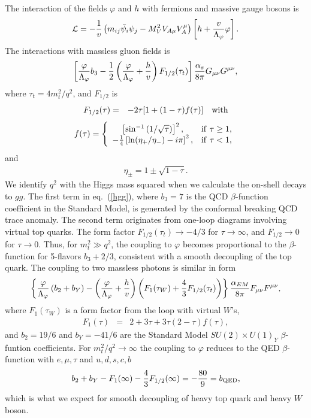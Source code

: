 \documentclass[12pt]{article}
\def\beq{\begin{eqnarray}}
\def\eeq{\end{eqnarray}}
\def\bea{\begin{eqnarray}}
\def\eea{\end{eqnarray}}
\begin{document}
The interaction of the fields 
$\varphi$
and $h$ with fermions and massive gauge bosons is 
\beq
{\cal L} = -\frac{1}{v} \left( m_{ij}\bar\psi_i
\psi_j - M_V^2 V_{A\mu}V_A^\mu \right) \left[ h+ 
\frac{v}{\Lambda_\varphi}  \varphi
\right] .
\eeq
The interactions with massless gluon fields is
\beq
\left[ {\varphi\over \Lambda_\varphi} 
b_3- \frac{1}{2}\left ({\varphi\over
\Lambda_\varphi}+{h\over v}\right ) F_{1/2}(\tau_t)\right]
\frac{\alpha_s}{8\pi}G_{\mu\nu}G^{\mu\nu},
\label{hgg}
\eeq
where $\tau_t=4m^2_t/q^2$, and $F_{1/2}$ is~\cite{HHG}
\bea
F_{1/2}(\tau) & = & -2\tau [1+(1-\tau)f(\tau)]~~~{\rm with} 
\eea
\beq
f(\tau)  =  \left\{ \begin{array}{cc}
      \left[ \sin^{-1}\left( 1/\sqrt{\tau}\right)\right]^2, &
               {\rm if}~\tau\ge 1, \\
      -\frac{1}{4}\left[ \ln (\eta_+/\eta_-)-i\pi\right]^2, &
               {\rm if}~\tau < 1,
                      \end{array}  \right.
\eeq
and
\beq
\eta_{\pm} = 1 \pm \sqrt{1-\tau} .
\eeq
 We identify $q^2$ with the Higgs mass squared when we calculate
the on-shell decays to $gg$.
The first term in eq.~(\ref{hgg}), 
where $b_3=7$ is the QCD $\beta$-function coefficient
in the Standard Model, is generated by the conformal breaking QCD trace anomaly. The second term originates
from one-loop diagrams involving virtual top quarks. The form factor
$F_{1/2}(\tau_t)\to -4/3$ for $\tau\to\infty$,
and $F_{1/2}\to 0$ for $\tau\to 0$.  Thus, for $m_t^2\gg q^2$, the coupling to $\varphi$ becomes
proportional to the $\beta$-function for 5-flavors $b_3+2/3$,
consistent with a smooth decoupling of the top quark.
The coupling to two massless photons is similar in form
\beq
\left \{{\varphi\over \Lambda_\varphi} \left (b_{2}+b_Y\right)
-\left ({\varphi\over
\Lambda_\varphi}+{h\over v}\right )\left (F_1(\tau_W)+
\frac{4}{3}F_{1/2}(\tau_t)\right) \right  \}
\frac{\alpha_{EM}}{8\pi}F_{\mu\nu}F^{\mu\nu},
\label{hgaga}
\eeq
where $F_1(\tau_W)$ is a form factor from the loop with virtual $W$'s,
\beq
F_1(\tau) &= & 2+3\tau+3\tau(2-\tau)f(\tau),
\eeq
and $b_2=19/6$ and $b_Y=-41/6$ are the Standard Model $SU(2)\times U(1)_Y$ $\beta$-funtion
coefficients. For $m_t^2/q^2\to \infty$ 
the coupling to $\varphi$ reduces to the
QED $\beta$-function with $e,\mu,\tau$ and $u,d,s,c,b$
\beq
b_2+b_Y-F_1(\infty)-\frac{4}{3}F_{1/2}(\infty)=-\frac{80}{9}=b_{\rm QED},
\eeq 
which is what we expect for smooth decoupling of heavy top quark and heavy $W$ boson.
\end{document}
